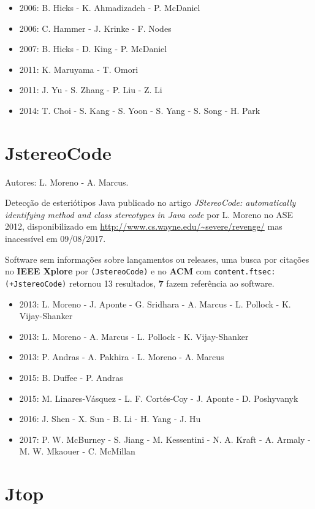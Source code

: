 \begin{itemize}
\item 2006: B. Hicks - K. Ahmadizadeh - P. McDaniel
\item 2006: C. Hammer - J. Krinke - F. Nodes
\item 2007: B. Hicks - D. King - P. McDaniel
\item 2011: K. Maruyama - T. Omori
\item 2011: J. Yu - S. Zhang - P. Liu - Z. Li
\item 2014: T. Choi - S. Kang - S. Yoon - S. Yang - S. Song - H. Park
\end{itemize}

\section{JstereoCode}

Autores:
L. Moreno - A. Marcus.

Detecção de esteriótipos Java
publicado no artigo {\it JStereoCode: automatically identifying method and class stereotypes in Java code}
por L. Moreno
no ASE 2012,
disponibilizado em \url{http://www.cs.wayne.edu/~severe/revenge/}
mas inacessível em 09/08/2017.

Software sem informações sobre lançamentos ou releases,
uma busca por citações no {\bf IEEE Xplore} por
\texttt{(JstereoCode)}
e no {\bf ACM} com
\texttt{content.ftsec:(+JstereoCode)}
retornou
13 resultados,
{\bf 7} fazem referência ao software.

\begin{itemize}
\item 2013: L. Moreno - J. Aponte - G. Sridhara - A. Marcus - L. Pollock - K. Vijay-Shanker
\item 2013: L. Moreno - A. Marcus - L. Pollock - K. Vijay-Shanker
\item 2013: P. Andras - A. Pakhira - L. Moreno - A. Marcus
\item 2015: B. Duffee - P. Andras
\item 2015: M. Linares-Vásquez - L. F. Cortés-Coy - J. Aponte - D. Poshyvanyk
\item 2016: J. Shen - X. Sun - B. Li - H. Yang - J. Hu
\item 2017: P. W. McBurney - S. Jiang - M. Kessentini - N. A. Kraft - A. Armaly - M. W. Mkaouer - C. McMillan
\end{itemize}

\section{Jtop}

